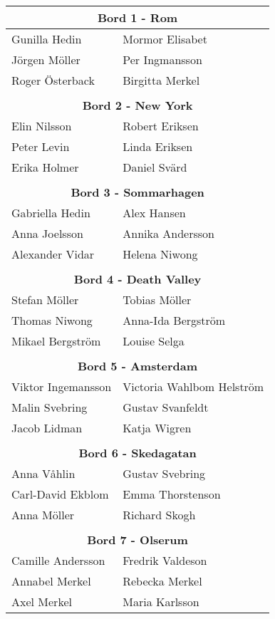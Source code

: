 \documentclass[a5paper]{article}
\begin{document}
\begin{landscape}
\begin{center}											
	\begin{tabular}{  l  l }											
		\multicolumn{2}{c}{\textbf{	Bord 1 - Rom	}} \\ \hline								
		Gunilla Hedin	&	Mormor Elisabet	\\								
		Jörgen Möller	&	Per Ingmansson	\\								
		Roger Österback	&	Birgitta Merkel	\\								
		&		\\ 								
		\multicolumn{2}{c}{\textbf{	Bord 2 - New York	}} \\ \hline								
		Elin Nilsson	&	Robert Eriksen	\\								
		Peter Levin	&	Linda Eriksen	\\								
		Erika Holmer	&	Daniel Svärd	\\								
		&		\\ 								
		\multicolumn{2}{c}{\textbf{	Bord 3 - Sommarhagen	}} \\ \hline								
		Gabriella Hedin	&	Alex Hansen	\\								
		Anna Joelsson	&	Annika Andersson	\\								
		Alexander Vidar	&	Helena Niwong	\\								
		&		\\								
		\multicolumn{2}{c}{\textbf{	Bord 4 - Death Valley	}} \\ \hline								
		Stefan Möller	&	Tobias Möller	\\								
		Thomas Niwong	&	Anna-Ida Bergström	\\								
		Mikael Bergström	&	Louise Selga	\\								
		&		\\ 								
		\multicolumn{2}{c}{\textbf{	Bord 5 - Amsterdam	}} \\ \hline								
		Viktor Ingemansson	&	Victoria Wahlbom Helström	\\								
		Malin Svebring	&	Gustav Svanfeldt	\\								
		Jacob Lidman	&	Katja Wigren	\\								
		&		\\ 								
		\multicolumn{2}{c}{\textbf{	Bord 6 - Skedagatan	}} \\ \hline								
		Anna Våhlin	&	Gustav Svebring	\\								
		Carl-David Ekblom	&	Emma Thorstenson	\\								
		Anna Möller	&	Richard Skogh	\\								
		&		\\ 								
		\multicolumn{2}{c}{\textbf{	Bord 7 - Olserum	}} \\ \hline								
		Camille Andersson	&	Fredrik Valdeson	\\								
		Annabel Merkel	&	Rebecka Merkel	\\								
		Axel Merkel	&	Maria Karlsson	\\								
		

\end{tabular}
\end{center}
\end{landscape}
\end{document}
